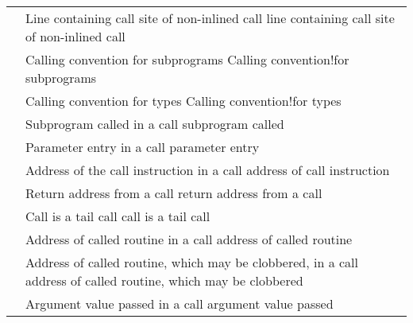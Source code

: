 \begin{longtable}{P{6.2cm}|P{8.5cm}}
&
           {Line containing call site of non-inlined call} 
           {line containing call site of non-inlined call} \\
\DWATcallingconventionTARG{} 
&
           {Calling convention for subprograms}
           {Calling convention!for subprograms} \\
&
           {Calling convention for types}
           {Calling convention!for types} \\
\DWATcalloriginTARG{}
&
           {Subprogram called in a call}
           {subprogram called}
            \\
\DWATcallparameterTARG{}
&
           {Parameter entry in a call}
           {parameter entry}
            \\
\DWATcallpcTARG{}
&
           {Address of the call instruction in a call}
           {address of call instruction}
            \\
\DWATcallreturnpcTARG{}
&
           {Return address from a call}
           {return address from a call}
            \\
\DWATcalltailcallTARG{}
&
           {Call is a tail call}
           {call is a tail call}
            \\
\DWATcalltargetTARG{}
&
           {Address of called routine in a call}
           {address of called routine}
            \\
\DWATcalltargetclobberedTARG{}
&
           {Address of called routine, which may be clobbered, in a call}
           {address of called routine, which may be clobbered}
            \\
\DWATcallvalueTARG{}
&
           {Argument value passed in a call}
           {argument value passed}
            \\

\end{longtable}
